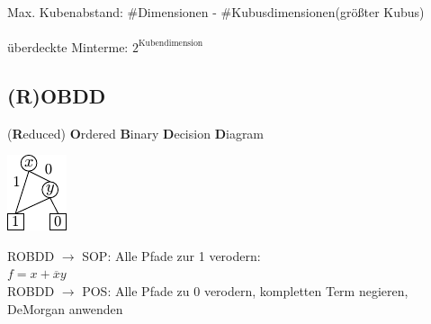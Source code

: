 \documentclass[6pt,a4paper]{scrartcl}
\newcommand{\ra}[0]{\ensuremath{\rightarrow}} 									%
\begin{document}
\begin{multicols}{3}
{	\\
	Max. Kubenabstand: \#Dimensionen - \#Kubusdimensionen(größter Kubus) \\
	} \\
	überdeckte Minterme: $2^{\text{Kubendimension}}$
	\subsection{(R)OBDD}
	(\textbf{R}educed) \textbf{O}rdered \textbf{B}inary \textbf{D}ecision \textbf{D}iagram\\
	\parbox{2.0cm}{ \includegraphics{img/ds/robdd.pdf} }
	\parbox{5.0cm}{ ROBDD $\rightarrow$ SOP: Alle Pfade zur 1 verodern:\\ $f = x + \overline xy$ \\ 
					ROBDD $ \ra$ POS: Alle Pfade zu 0 verodern, kompletten Term negieren, DeMorgan anwenden} \\
	



\end{multicols}
\end{document}
